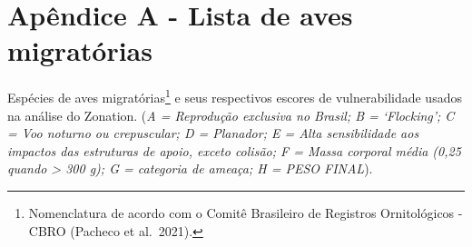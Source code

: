 \documentclass[
  oneside]{scrbook}
\begin{document}
\hypertarget{apendice}{%
\appendix}


\pagestyle{headings}

\hypertarget{apuxeandice-a---lista-de-aves-migratuxf3rias}{%
\chapter{Apêndice A - Lista de aves migratórias}\label{apuxeandice-a---lista-de-aves-migratuxf3rias}}

\hspace{1.5cm}

Espécies de aves migratórias\footnote{Nomenclatura de acordo com o Comitê Brasileiro de Registros Ornitológicos - CBRO (Pacheco et al.~2021).} e seus respectivos escores de vulnerabilidade usados na análise do Zonation. (\emph{A = Reprodução exclusiva no Brasil; B = `Flocking'; C = Voo noturno ou crepuscular; D = Planador; E = Alta sensibilidade aos impactos das estruturas de apoio, exceto colisão; F = Massa corporal média (0,25 quando \textgreater{} 300 g); G = categoria de ameaça; H = PESO FINAL}).

\hspace{1.0cm}
\end{document}
